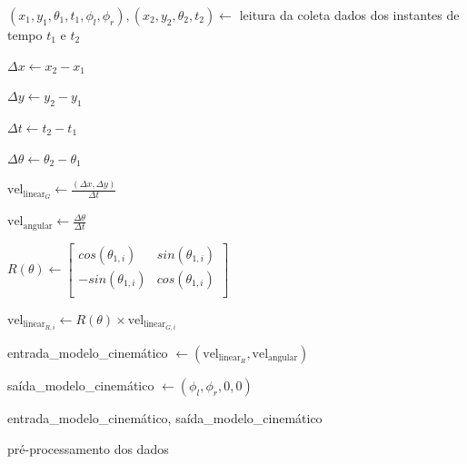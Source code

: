 \begin{algorithm}[H]
    \label{pre:processamento:}
    
    
    $(x_1,y_1,\theta_{1},t_1,\phi_l,\phi_r),(x_2,y_2,\theta_{2},t_2) \leftarrow$ leitura da coleta dados dos instantes de
    tempo $t_1$ e $t_2$

    $\Delta x \leftarrow x_2 - x_1$
    
    $\Delta y \leftarrow y_2 - y_1$

    $\Delta t \leftarrow t_2 - t_1$

    $\Delta \theta \leftarrow \theta_2 - \theta_1$

    \Se {$\Delta \theta > \pi$ }{
                $\Delta \theta \leftarrow \Delta \theta -2\pi $
    }

    \Se {$\Delta \theta < -\pi$ }{
                $\Delta \theta \leftarrow \Delta \theta +2\pi $
    }

    $\text{vel}_{\text{linear}_G} \leftarrow \frac{(\Delta x,\Delta y)}{\Delta t}$

    $\text{vel}_{\text{angular}} \leftarrow \frac{\Delta \theta}{\Delta t}$



     {
       
        $
        R(\theta) \leftarrow 
        \begin{bmatrix}
            cos(\theta_{1,i})  & sin(\theta_{1,i})\\
            -sin(\theta_{1,i}) & cos(\theta_{1,i})\\
        \end{bmatrix}
        $

        $\text{vel}_{\text{linear}_{R,i}} \leftarrow R(\theta) \times \text{vel}_{\text{linear}_{G,i}}$
    }
    
    entrada\_modelo\_cinemático $\leftarrow (\text{vel}_{\text{linear}_{R}},\text{vel}_{\text{angular}})$

    
      {
        saída\_modelo\_cinemático $\leftarrow (\phi_l,\phi_r,0,0)$
      }

   

      \Retorna entrada\_modelo\_cinemático, saída\_modelo\_cinemático
    
    \caption{pré-processamento dos dados}
    
\end{algorithm}

